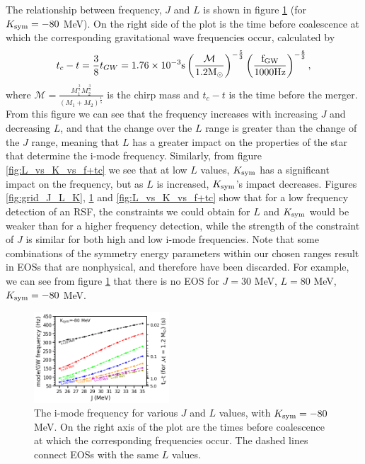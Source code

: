 \documentclass[fleqn,usenatbib]{mnras}
\begin{document}
The relationship between frequency, $J$ and $L$ is shown in figure \ref{fig:J_vs_L_vs_f+tc} (for $K_{\rm sym}=-80$ MeV). On the right side of the plot is the time before coalescence at which the corresponding gravitational wave frequencies occur, calculated by \citep{tsang2012resonant,blanchet2006gravitational}
\begin{align}
t_c-t=\frac{3}{8}t_{GW}=1.76\times 10^{-3}\rm{s}\left(\frac{\mathcal{M}}{1.2M_{\odot}}\right)^{-\frac{5}{3}}\left(\frac{f_{GW}}{1000 \rm{Hz}}\right)^{-\frac{8}{3}},
\label{eq:t_before_merger}
\end{align}
\noindent where $\mathcal{M}=\frac{M_1^{\frac{3}{5}}M_2^{\frac{3}{5}}}{(M_1+M_2)^{\frac{1}{5}}}$ is the chirp mass and $t_c-t$ is the time before the merger. From this figure we can see that the frequency increases with increasing $J$ and decreasing $L$, and that the change over the $L$ range is greater than the change of the $J$ range, meaning that $L$ has a greater impact on the properties of the star that determine the i-mode frequency. Similarly, from figure \ref{fig:L_vs_K_vs_f+tc} we see that at low $L$ values, $K_{\rm sym}$ has a significant impact on the frequency, but as $L$ is increased, $K_{\rm sym}$'s impact decreases. Figures \ref{fig:grid_J_L_K}, \ref{fig:J_vs_L_vs_f+tc} and \ref{fig:L_vs_K_vs_f+tc} show that for a low frequency detection of an RSF, the constraints we could obtain for $L$ and $K_{\rm sym}$ would be weaker than for a higher frequency detection, while the strength of the constraint of $J$ is similar for both high and low i-mode frequencies. Note that some combinations of the symmetry energy parameters within our chosen ranges result in EOSs that are nonphysical, and therefore have been discarded. For example, we can see from figure \ref{fig:J_vs_L_vs_f+tc} that there is no EOS for $J=30$ MeV, $L=80$ MeV, $K_{\rm sym}=-80$ MeV.


\begin{figure}
\centering
\includegraphics[width=0.45\textwidth,angle=0]{J_L_f_tc_K-80.png}
\caption{The i-mode frequency for various $J$ and $L$ values, with $K_{\rm sym}=-80$ MeV. On the right axis of the plot are the times before coalescence at which the corresponding frequencies occur. The dashed lines connect EOSs with the same $L$ values.}
\label{fig:J_vs_L_vs_f+tc}
\end{figure}
\end{document}
